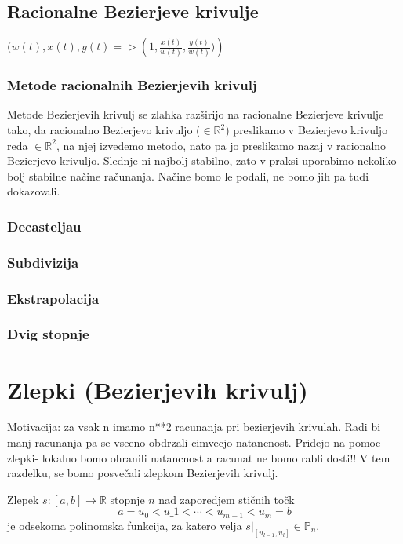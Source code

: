 \documentclass[isrm2, tisk]{fmfdelo}
\newcommand{\R}{\mathbb R}
\newcommand{\Pn}{\mathbb P_n}
\begin{document}
    \subsection{Racionalne Bezierjeve krivulje}


    $(w(t),x(t),y(t) => \left(1,\frac{x(t)}{w(t)},\frac{y(t)}{w(t)})\right)$

    \subsubsection{Metode racionalnih Bezierjevih krivulj}
    Metode Bezierjevih krivulj se zlahka razširijo na racionalne Bezierjeve krivulje tako, da racionalno Bezierjevo krivuljo ($\in\R^2$) preslikamo v Bezierjevo krivuljo reda $\in\R^2$, na njej izvedemo metodo, nato pa jo preslikamo nazaj v racionalno Bezierjevo krivuljo. Slednje ni najbolj stabilno, zato v praksi uporabimo nekoliko bolj stabilne načine računanja. Načine bomo le podali, ne bomo jih pa tudi dokazovali.

    \subsubsection{Decasteljau}

    \subsubsection{Subdivizija}

    \subsubsection{Ekstrapolacija}

    \subsubsection{Dvig stopnje}


    \section{Zlepki (Bezierjevih krivulj)}
    Motivacija: za vsak n imamo n**2 racunanja pri bezierjevih krivulah. Radi bi manj racunanja pa se vseeno obdrzali cimvecjo natancnost. Pridejo na pomoc zlepki- lokalno bomo ohranili natancnost a racunat ne bomo rabli dosti!!
    V tem razdelku, se bomo posvečali zlepkom Bezierjevih krivulj.

    \begin{definicija}
        Zlepek $s:[a,b]\to \R $  stopnje $n$ nad zaporedjem stičnih točk \[a=u_0 < u\_1 < \cdots < u_{m-1} < u_m = b\]
        je odsekoma polinomska funkcija, za katero velja $s|_{[u_{l-1},u_l]} \in \Pn$.
    \end{definicija}
\end{document}

